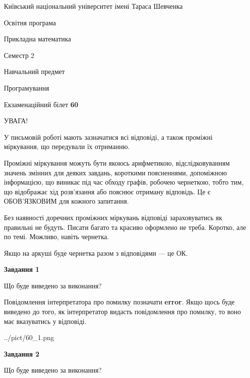\documentclass[12pt, ukrainian]{article}
\begin{document}
{{\begin {small}\par
{ \center  Київський національний університет імені Тараса Шевченка \par}
{\parbox {5 cm}{Освітня програма \hfill}{\parbox {7 cm}{Прикладна математика \hfill}}\parbox {6 cm}{\hfill Семестр 2}}\par
{\parbox {5 cm} {Навчальний предмет \hfill}\parbox {7 cm}{Програмування \hfill}\parbox {6cm}{\hfill}\par}\vspace{-7pt} \end{small}}{\center Екзаменаційний білет \No \textbf
{ 60 }\par}}
{
\begin {large}
УВАГА!

У письмовій роботі мають зазначатися всі відповіді, а також проміжні міркування, що передували їх отриманню.

Проміжні міркування можуть бути якоюсь арифметикою, відслідковуванням зна\-чень змінних для деяких завдань,
короткими поясненнями, допоміжною інформацією, що виникає під час обходу графів, робочею чернеткою,
тобто тим, що відображає хід розв’язання або пояснює отриману відповідь.
Це є ОБОВ’ЯЗКОВИМ для кожного запитання.

Без наявності доречних проміжних міркувань відповіді зараховуватись як правиль\-ні не будуть.
Писати багато та красиво оформлено не треба. Коротко, але по темі. Можли\-во, навіть чернетка.

Якщо на аркуші буде чернетка разом з відповідями --- це ОК.

\newpage

{\begin {center}\textbf{Завдання 1}\end {center}}\par
Що буде виведено за виконання?

Повідомлення інтерпретатора про помилку позначати \textbf{error}.
Якщо щось буде виведено до того, як інтерпретатор видасть повідомлення про помилку, 
то воно має вказуватись у відповіді. \par


\begin{center}
	{../pict/60_1.png}
\end{center}
\newpage

{\begin {center}\textbf{Завдання 2}\end {center}}\par
Що буде виведено за виконання?


\end{large}}
\end{document}
